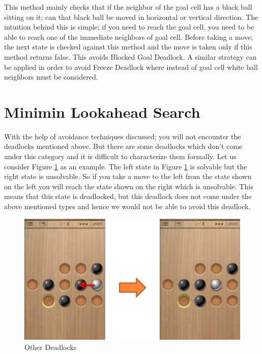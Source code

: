 \documentclass[letterpaper]{article}
\begin{document}
This method mainly checks that if the neighbor of the goal cell has a black ball sitting on it; can that black ball be moved in horizontal or vertical direction. The intuition behind this is simple; if you need to reach the goal cell, you need to be able to reach one of the immediate neighbors of goal cell. Before taking a move; the next state is checked against this method and the move is taken only if this method returns false. This avoids Blocked Goal Deadlock. A similar strategy can be applied in order to avoid Freeze Deadlock where instead of goal cell white ball neighbors must be considered. 

  
\section{Minimin Lookahead Search}
With the help of avoidance techniques discussed; you will not encounter the deadlocks mentioned above. But there are some deadlocks which don't come under this category and it is difficult to characterize them formally. Let us consider Figure \ref{fig:Other-Deadlock} as an example. The left state in Figure \ref{fig:Other-Deadlock} is solvable but the right state is unsolvable. So if you take a move to the left from the state shown on the left you will reach the state shown on the right which is unsolvable. This means that this state is deadlocked, but this deadlock does not come under the above mentioned types and hence we would not be able to avoid this deadlock.


\begin{figure}
\centering
\includegraphics[scale=.5]{Other-Deadlock.png} \caption{Other Deadlocks}
\label{fig:Other-Deadlock}
\end{figure}
\end{document}
